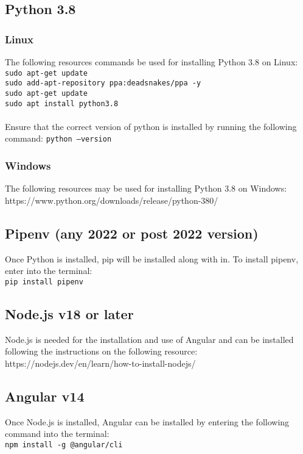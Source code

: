 \documentclass{article}
\newcommand{\code}[1]{\colorbox{light-gray}{\texttt{#1}}}
\begin{document}
\subsection{Python 3.8}
\subsubsection{Linux}
The following resources commands be used for installing Python 3.8 on Linux:\\
\code{sudo apt-get update}\\
\code{sudo add-apt-repository ppa:deadsnakes/ppa -y}\\
\code{sudo apt-get update}\\
\code{sudo apt install python3.8}\\ \\
Ensure that the correct version of python is installed by running the following command:
\code{python --version}

\subsubsection{Windows}
The following resources may be used for installing Python 3.8 on Windows:
https://www.python.org/downloads/release/python-380/

\subsection{Pipenv (any 2022 or post 2022 version)}
Once Python is installed, pip will be installed along with in. To install pipenv, enter into the terminal:\\
\code{pip install pipenv}

\subsection{Node.js v18 or later}
Node.js is needed for the installation and use of Angular and can be installed
following the instructions on the following resource:\\
https://nodejs.dev/en/learn/how-to-install-nodejs/

\subsection{Angular v14}
Once Node.js is installed, Angular can be installed by entering the following command into the terminal:\\
\code{npm install -g @angular/cli}
\end{document}

